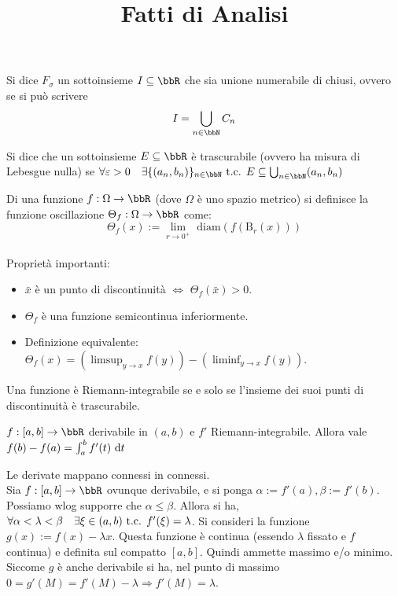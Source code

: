 \documentclass[a4paper,NoNotes,GeneralMath]{stdmdoc}
\newcommand{\B}{\mbox{B}}
\newcommand{\diam}{\mbox{ diam}}
\begin{document}
\title{Fatti di Analisi}

 Si dice $F_\sigma$ un sottoinsieme $I \subseteq \bbR$ che sia unione numerabile di chiusi, ovvero se si può scrivere $$I = \bigcup_{n\in\bbN} C_n$$

 Si dice che un sottoinsieme $E \subseteq \bbR$ è trascurabile (ovvero ha misura di Lebesgue nulla) se $\forall \varepsilon > 0 \quad \exists \{(a_n, b_n)\}_{n\in\bbN} \tc E \subseteq \bigcup_{n\in\bbN} (a_n, b_n)$

 Di una funzione $f: \Omega \rightarrow \bbR$ (dove $\Omega$ è uno spazio metrico) si definisce la funzione oscillazione $\Theta_{f}: \Omega \rightarrow \bbR$ come: $$\Theta_{f}(x) := \lim_{r \rightarrow 0^{+}} \diam (f(\B_r(x)))$$ \\
Proprietà importanti: \begin{itemize}
	\item $\bar{x}$ è un punto di discontinuità $\Leftrightarrow$ $\Theta_f(\bar{x}) > 0$.
	\item $\Theta_f$ è una funzione semicontinua inferiormente.
	\item Definizione equivalente: $\Theta_f(x) = \left( \limsup_{y \rightarrow x} f(y) \right) - \left( \liminf_{y \rightarrow x} f(y) \right)$.
\end{itemize}

 Una funzione è Riemann-integrabile se e solo se l'insieme dei suoi punti di discontinuità è trascurabile.

 $f: [a, b] \rightarrow \bbR$ derivabile in $(a,b)$ e $f'$ Riemann-integrabile. Allora vale $f(b) - f(a) = \int_{a}^{b} f'(t) \de t$

 Le derivate mappano connessi in connessi. \\
Sia $f: [a,b] \rightarrow \bbR$ ovunque derivabile, e si ponga $\alpha := f'(a), \beta := f'(b)$. Possiamo wlog supporre che $\alpha \le \beta$. Allora si ha, $\forall \alpha < \lambda < \beta \quad \exists \xi \in (a, b) \mbox{ t.c. } f'(\xi) = \lambda$.
\Dimostrazione Si consideri la funzione $g(x) := f(x) - \lambda x$. Questa funzione è continua (essendo $\lambda$ fissato e $f$ continua) e definita sul compatto $[a,b]$. Quindi ammette massimo e/o minimo. Siccome $g$ è anche derivabile si ha, nel punto di massimo $0 = g'(M) = f'(M) - \lambda \Rightarrow f'(M) = \lambda$.
\end{document}
